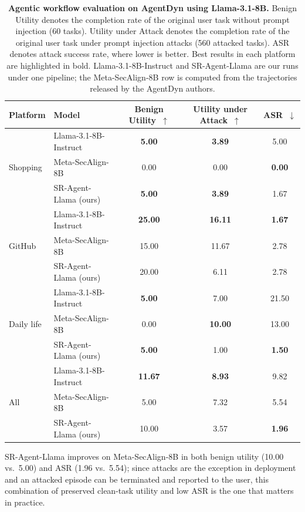 \begin{table}[h]
\centering
\small
\caption{\textbf{Agentic workflow evaluation on AgentDyn using Llama-3.1-8B.} Benign Utility denotes the completion
rate of the original user task without prompt injection (60 tasks). Utility under Attack denotes the completion rate
of the original user task under prompt injection attacks (560 attacked tasks). ASR denotes attack success rate, where
lower is better. Best results in each platform are
highlighted in bold. Llama-3.1-8B-Instruct and SR-Agent-Llama are our runs under one pipeline; the Meta-SecAlign-8B
row is computed from the trajectories released by the AgentDyn authors.}
\label{tab:agentdyn}
\begin{tabular}{llccc}
\toprule
\textbf{Platform} & \textbf{Model} & \textbf{Benign Utility}~$\uparrow$ & \textbf{Utility under Attack}~$\uparrow$ & \textbf{ASR}~$\downarrow$ \\
\midrule
\multirow{3}{*}{Shopping}
 & Llama-3.1-8B-Instruct & \textbf{5.00} & \textbf{3.89} & 5.00 \\
 & Meta-SecAlign-8B      & 0.00 & 0.00 & \textbf{0.00} \\
 & SR-Agent-Llama (ours) & \textbf{5.00} & \textbf{3.89} & 1.67 \\
\midrule
\multirow{3}{*}{GitHub}
 & Llama-3.1-8B-Instruct & \textbf{25.00} & \textbf{16.11} & \textbf{1.67} \\
 & Meta-SecAlign-8B      & 15.00 & 11.67 & 2.78 \\
 & SR-Agent-Llama (ours) & 20.00 & 6.11 & 2.78 \\
\midrule
\multirow{3}{*}{Daily life}
 & Llama-3.1-8B-Instruct & \textbf{5.00} & 7.00 & 21.50 \\
 & Meta-SecAlign-8B      & 0.00 & \textbf{10.00} & 13.00 \\
 & SR-Agent-Llama (ours) & \textbf{5.00} & 1.00 & \textbf{1.50} \\
\midrule
\multirow{3}{*}{All}
 & Llama-3.1-8B-Instruct & \textbf{11.67} & \textbf{8.93} & 9.82 \\
 & Meta-SecAlign-8B      & 5.00 & 7.32 & 5.54 \\
 & SR-Agent-Llama (ours) & 10.00 & 3.57 & \textbf{1.96} \\
\bottomrule
\end{tabular}
\end{table}

SR-Agent-Llama improves on Meta-SecAlign-8B in both benign utility (10.00 vs.\ 5.00) and ASR (1.96 vs.\ 5.54);
since attacks are the exception in deployment and an attacked episode can be terminated and reported to the user, this
combination of preserved clean-task utility and low ASR is the one that matters in practice.
